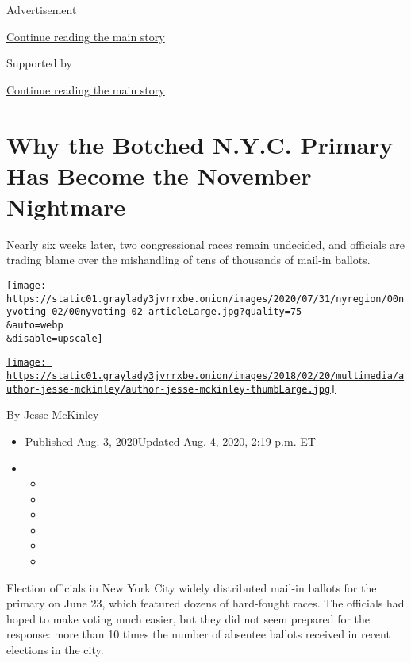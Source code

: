 Advertisement

\protect\hyperlink{after-top}{Continue reading the main story}

Supported by

\protect\hyperlink{after-sponsor}{Continue reading the main story}

\hypertarget{why-the-botched-nyc-primary-has-become-the-november-nightmare}{%
\section{Why the Botched N.Y.C. Primary Has Become the November
Nightmare}\label{why-the-botched-nyc-primary-has-become-the-november-nightmare}}

Nearly six weeks later, two congressional races remain undecided, and
officials are trading blame over the mishandling of tens of thousands of
mail-in ballots.

\texttt{[image: https://static01.graylady3jvrrxbe.onion/images/2020/07/31/nyregion/00nyvoting-02/00nyvoting-02-articleLarge.jpg?quality=75\\\&auto=webp\\\&disable=upscale]}

\href{https://www.nytimes3xbfgragh.onion/by/jesse-mckinley}{\texttt{[image: https://static01.graylady3jvrrxbe.onion/images/2018/02/20/multimedia/author-jesse-mckinley/author-jesse-mckinley-thumbLarge.jpg]}}

By \href{https://www.nytimes3xbfgragh.onion/by/jesse-mckinley}{Jesse
McKinley}

\begin{itemize}
\item
  Published Aug. 3, 2020Updated Aug. 4, 2020, 2:19 p.m. ET
\item
  \begin{itemize}
  \item
  \item
  \item
  \item
  \item
  \item
  \end{itemize}
\end{itemize}

Election officials in New York City widely distributed mail-in ballots
for the primary on June 23, which featured dozens of hard-fought races.
The officials had hoped to make voting much easier, but they did not
seem prepared for the response: more than 10 times the number of
absentee ballots received in recent elections in the city.

